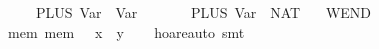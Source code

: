 \documentclass{llncs}
\begin{document}
\begin{isabellebody}
\ \ \ \ {}\ {}{}\ PLUS\ {}Var\ {}{}\ {}Var\ {}{}{}\isanewline
\ \ \ \ {}\ {}{}\ PLUS\ {}Var\ {}{}\ {}NAT\ {}{}\isanewline
\ \ WEND{}\isanewline
\ \ {}{}mem{}\ mem\ {}\ {}\ {}x\ {}\ y{}{}{}{}\isanewline
%
\isadelimproof
\ \ %
\endisadelimproof
%
\isatagproof
{}\isamarkupfalse%
\ hoare{}auto\ smt%
\endisatagproof
\end{isabellebody}
\end{document}
